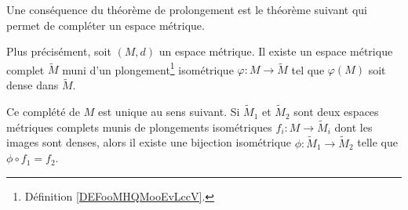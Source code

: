 Une conséquence du théorème de prolongement est le théorème suivant qui permet de compléter un espace métrique.
\begin{theorem}          \label{ThoKHTQJXZ}
	Plus précisément, soit \( (M,d)\) un espace métrique. Il existe un espace métrique complet \( \tilde M\) muni d'un plongement\footnote{Définition \ref{DEFooMHQMooEvLccV}.} isométrique \( \varphi\colon M\to \tilde M\) tel que \( \varphi(M)\) soit dense dans \( \tilde M\).

	Ce complété de \( M\) est unique au sens suivant. Si \( \tilde M_1\) et \( \tilde M_2\) sont deux espaces métriques complets munis de plongements isométriques \( f_i\colon M\to \tilde M_i\) dont les images sont denses, alors il existe une bijection isométrique \( \phi\colon \tilde M_1\to \tilde M_2\) telle que \( \phi\circ f_1=f_2\).
\end{theorem}

